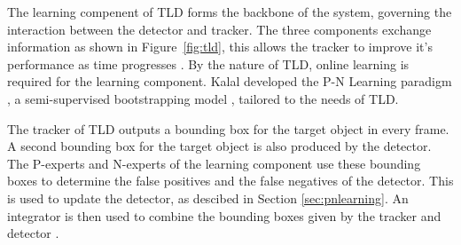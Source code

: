   The learning compenent of TLD forms the backbone of the system, governing the interaction between the detector and tracker.
  The three components exchange information as shown in Figure~\ref{fig:tld}, this allows the tracker to improve it's performance as time progresses \cite{Kalal2011}.
  By the nature of TLD, online learning is required for the learning component.
  Kalal developed the P-N Learning paradigm \cite{PNLearning}, a semi-supervised bootstrapping model \cite{murphy2012}, tailored to the needs of TLD.

  The tracker of TLD outputs a bounding box for the target object in every frame.
  A second bounding box for the target object is also produced by the detector.
  The P-experts and N-experts of the learning component use these bounding boxes to determine the false positives and the false negatives of the detector.
  This is used to update the detector, as descibed in Section \ref{sec:pnlearning}.
  An integrator is then used to combine the bounding boxes given by the tracker and detector \cite{Kalal2011}.

